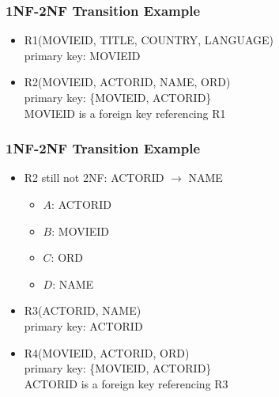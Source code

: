 \documentclass[dvipsnames]{beamer}
\begin{document}
\begin{frame}
  \frametitle{1NF-2NF Transition Example}

  \begin{example}
    \begin{itemize}
      \item R1(MOVIEID, TITLE, COUNTRY, LANGUAGE)\\
        primary key: MOVIEID

      \pause
      \item R2(MOVIEID, ACTORID, NAME, ORD)\\
        primary key: \{MOVIEID, ACTORID\}\\
        MOVIEID is a foreign key referencing R1
    \end{itemize}
 \end{example}
\end{frame}

\begin{frame}
  \frametitle{1NF-2NF Transition Example}

  \begin{example}
    \begin{itemize}
      \item R2 still not 2NF: ACTORID $\rightarrow$ NAME

      \pause
      \begin{itemize}
        \item $A$: ACTORID
        \item $B$: MOVIEID
        \item $C$: ORD
        \item $D$: NAME
      \end{itemize}
    \end{itemize}

    \pause
    \begin{itemize}
      \item R3(ACTORID, NAME)\\
        primary key: ACTORID

      \pause
      \item R4(MOVIEID, ACTORID, ORD)\\
        primary key: \{MOVIEID, ACTORID\}\\
        ACTORID is a foreign key referencing R3
    \end{itemize}
  \end{example}
\end{frame}
\end{document}
